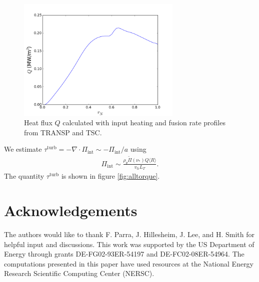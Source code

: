 \documentclass[aip, pop, preprint]{revtex4-1}
\numberwithin{figure}{section}
\numberwithin{equation}{section}
\begin{document}
\begin{figure}[h!]
\centering
\includegraphics[width=0.7\textwidth]{turbHeatFlux.png}
\caption{\label{fig:turbHeatFlux} Heat flux $Q$ calculated with input heating and fusion rate profiles from TRANSP and TSC.}
\end{figure}

We estimate $\tau^{\text{turb}} = - \nabla \cdot \Pi_{\text{int}} \sim -\Pi_{\text{int}}/a$ using 
\begin{gather}
\Pi_{\text{int}} \sim \frac{\rho_{\theta} \widetilde{\Pi}(\nu_*) Q \langle R \rangle}{v_{ti} L_T}.
\end{gather}
The quantity $\tau^{\text{turb}}$ is shown in figure \ref{fig:alltorque}.

\FloatBarrier

\section*{Acknowledgements}
The authors would like to thank F. Parra, J. Hillesheim, J. Lee, and H. Smith for helpful input and discussions. This work was supported by the US Department of Energy through grants DE-FG02-93ER-54197 and DE-FC02-08ER-54964. The computations presented in this paper have used resources at the National Energy Research Scientific Computing Center (NERSC). 


\end{document}
